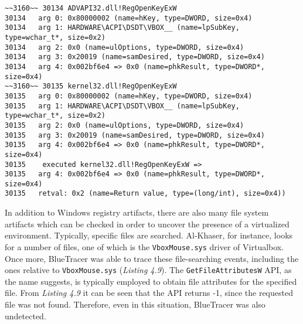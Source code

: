 \vspace{0.5cm}
\begin{lstlisting}[caption={Log entry relative to \texttt{RegOpenKeyExW} },captionpos=b]
~~3160~~ 30134 ADVAPI32.dll!RegOpenKeyExW
30134 	arg 0: 0x80000002 (name=hKey, type=DWORD, size=0x4)
30134 	arg 1: HARDWARE\ACPI\DSDT\VBOX__ (name=lpSubKey, type=wchar_t*, size=0x2)
30134 	arg 2: 0x0 (name=ulOptions, type=DWORD, size=0x4)
30134 	arg 3: 0x20019 (name=samDesired, type=DWORD, size=0x4)
30134 	arg 4: 0x002bf6e4 => 0x0 (name=phkResult, type=DWORD*, size=0x4)
~~3160~~ 30135 kernel32.dll!RegOpenKeyExW
30135 	arg 0: 0x80000002 (name=hKey, type=DWORD, size=0x4)
30135 	arg 1: HARDWARE\ACPI\DSDT\VBOX__ (name=lpSubKey, type=wchar_t*, size=0x2)
30135 	arg 2: 0x0 (name=ulOptions, type=DWORD, size=0x4)
30135 	arg 3: 0x20019 (name=samDesired, type=DWORD, size=0x4)
30135 	arg 4: 0x002bf6e4 => 0x0 (name=phkResult, type=DWORD*, size=0x4)
30135    executed kernel32.dll!RegOpenKeyExW =>
30135 	arg 4: 0x002bf6e4 => 0x0 (name=phkResult, type=DWORD*, size=0x4)
30135 	retval: 0x2 (name=Return value, type=(long/int), size=0x4))
\end{lstlisting}

In addition to Windows registry artifacts, there are also many file system artifacts which can be checked in order to uncover the presence of a virtualized environment. Typically, specific files are searched. Al-Khaser, for instance, looks for a number of files, one of which is the \texttt{VboxMouse.sys} driver of Virtualbox. Once more, BlueTracer was able to trace these file-searching events, including the ones relative to \texttt{VboxMouse.sys} (\textit{Listing 4.9}). The \texttt{GetFileAttributesW} API, as the name suggests, is typically employed to obtain file attributes for the specified file. From \textit{Listing 4.9} it can be seen that the API returns -1, since the requested file was not found. Therefore, even in this situation, BlueTracer was also undetected.

